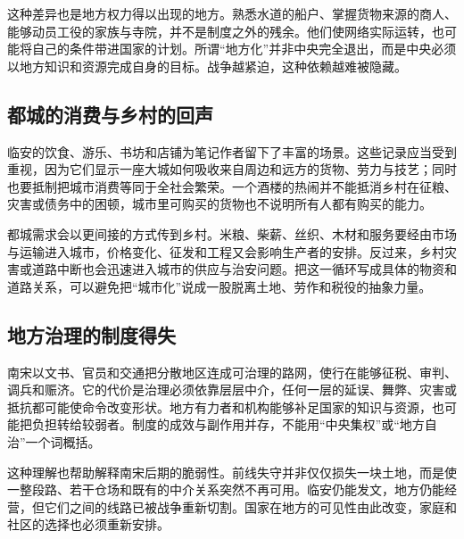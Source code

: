 这种差异也是地方权力得以出现的地方。熟悉水道的船户、掌握货物来源的商人、能够动员工役的家族与寺院，并不是制度之外的残余。他们使网络实际运转，也可能将自己的条件带进国家的计划。所谓“地方化”并非中央完全退出，而是中央必须以地方知识和资源完成自身的目标。战争越紧迫，这种依赖越难被隐藏。

\subsection{都城的消费与乡村的回声}

临安的饮食、游乐、书坊和店铺为笔记作者留下了丰富的场景。这些记录应当受到重视，因为它们显示一座大城如何吸收来自周边和远方的货物、劳力与技艺；同时也要抵制把城市消费等同于全社会繁荣。一个酒楼的热闹并不能抵消乡村在征粮、灾害或债务中的困顿，城市里可购买的货物也不说明所有人都有购买的能力。

都城需求会以更间接的方式传到乡村。米粮、柴薪、丝织、木材和服务要经由市场与运输进入城市，价格变化、征发和工程又会影响生产者的安排。反过来，乡村灾害或道路中断也会迅速进入城市的供应与治安问题。把这一循环写成具体的物资和道路关系，可以避免把“城市化”说成一股脱离土地、劳作和税役的抽象力量。

\subsection{地方治理的制度得失}

南宋以文书、官员和交通把分散地区连成可治理的路网，使行在能够征税、审判、调兵和赈济。它的代价是治理必须依靠层层中介，任何一层的延误、舞弊、灾害或抵抗都可能使命令改变形状。地方有力者和机构能够补足国家的知识与资源，也可能把负担转给较弱者。制度的成效与副作用并存，不能用“中央集权”或“地方自治”一个词概括。

这种理解也帮助解释南宋后期的脆弱性。前线失守并非仅仅损失一块土地，而是使一整段路、若干仓场和既有的中介关系突然不再可用。临安仍能发文，地方仍能经营，但它们之间的线路已被战争重新切割。国家在地方的可见性由此改变，家庭和社区的选择也必须重新安排。
